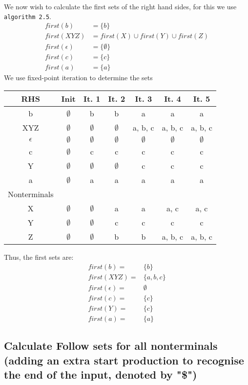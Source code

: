 \documentclass{article}
\begin{document}
We now wish to calculate the first sets of the right hand sides, for this we use \texttt{algorithm 2.5}.
\begin{align*}
first(b) &= \{b\}\\
first(XYZ) &= first(X) \cup first(Y) \cup first(Z)\\
first(\epsilon) &= \{\emptyset\}\\
first(c) &= \{c\}\\
first(a) &= \{a\}
\end{align*}
We use fixed-point iteration to determine the sets
\begin{table}[h]
\begin{center}
\begin{tabular}{|c|c|c|c|c|c|c|}
\hline
RHS & Init & It. 1 & It. 2 & It. 3 & It. 4 & It. 5\\
\hline
b & \(\emptyset\) & b & b & a & a & a\\
\hline
XYZ & \(\emptyset\) & \(\emptyset\) & \(\emptyset\) & a, b, c & a, b, c & a, b, c\\
\hline
\(\epsilon\) & $\emptyset$ & $\emptyset$ & $\emptyset$ & $\emptyset$ & $\emptyset$ & $\emptyset$\\
\hline
c & $\emptyset$ & c & c & c & c & c\\
\hline
Y & $\emptyset$ & $\emptyset$ & $\emptyset$ & c & c & c\\
\hline
a & $\emptyset$ & a & a & a & a & a\\
\hline
Nonterminals & & & & & &\\
\hline
X & $\emptyset$ & $\emptyset$ & a & a & a, c & a, c\\
\hline
Y & $\emptyset$ & $\emptyset$ & c & c & c & c\\
\hline
Z & $\emptyset$ & $\emptyset$ & b & b & a, b, c & a, b, c\\
\hline
\end{tabular}
\end{center}
\end{table} 

Thus, the first sets are:
\begin{align*}
first(b) =& \{b\}\\
first(XYZ) =& \{a,b,c\}\\
first(\epsilon) =& \emptyset\\
first(c) =& \{c\}\\
first(Y) =& \{c\}\\
first(a) =& \{a\}
\end{align*}
\subsection{Calculate Follow sets for all nonterminals (adding an extra start production to recognise the end of the input, denoted by "\$")}
\end{document}

